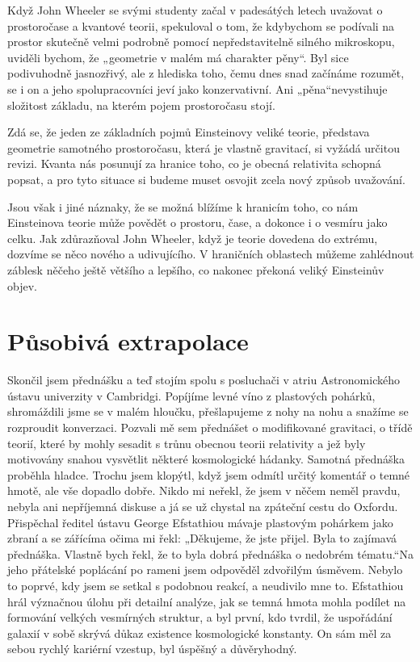   Když John Wheeler se svými studenty začal v padesátých letech uvažovat o prostoročase a kvantové
  teorii, spekuloval o tom, že kdybychom se podívali na prostor skutečně velmi podrobně pomocí
  nepředstavitelně silného mikroskopu, uviděli bychom, že „geometrie v malém má charakter pěny“. Byl
  sice podivuhodně jasnozřivý, ale z hlediska toho, čemu dnes snad začínáme rozumět, se i on a jeho
  spolupracovníci jeví jako konzervativní. Ani „pěna“nevystihuje složitost základu, na kterém pojem
  prostoročasu stojí. 
  
  Zdá se, že jeden ze základních pojmů Einsteinovy veliké teorie, představa geometrie samotného
  prostoročasu, která je vlastně gravitací, si vyžádá určitou revizi. Kvanta nás posunují za hranice
  toho, co je obecná relativita schopná popsat, a pro tyto situace si budeme muset osvojit zcela
  nový způsob uvažování. 
  
  Jsou však i jiné náznaky, že se možná blížíme k hranicím toho, co nám Einsteinova teorie může
  povědět o prostoru, čase, a dokonce i o vesmíru jako celku. Jak zdůrazňoval John Wheeler, když je
  teorie dovedena do extrému, dozvíme se něco nového a udivujícího. V hraničních oblastech můžeme
  zahlédnout záblesk něčeho ještě většího a lepšího, co nakonec překoná veliký Einsteinův objev.

\section{Působivá extrapolace}\label{kulIchIIIsecXIV}
  Skončil jsem přednášku a teď stojím spolu s posluchači v atriu Astronomického ústavu univerzity v
  Cambridgi. Popíjíme levné víno z plastových pohárků, shromáždili jsme se v malém hloučku,
  přešlapujeme z nohy na nohu a snažíme se rozproudit konverzaci. Pozvali mě sem přednášet o
  modifikované gravitaci, o třídě teorií, které by mohly sesadit s trůnu obecnou teorii relativity a
  jež byly motivovány snahou vysvětlit některé kosmologické hádanky. Samotná přednáška proběhla
  hladce. Trochu jsem klopýtl, když jsem odmítl určitý komentář o temné hmotě, ale vše dopadlo
  dobře. Nikdo mi neřekl, že jsem v něčem neměl pravdu, nebyla ani nepříjemná diskuse a já se už
  chystal na zpáteční cestu do Oxfordu. Přispěchal ředitel ústavu George Efstathiou mávaje plastovým
  pohárkem jako zbraní a se zářícíma očima mi řekl: „Děkujeme, že jste přijel. Byla to zajímavá
  přednáška. Vlastně bych řekl, že to byla dobrá přednáška o nedobrém tématu.“Na jeho přátelské
  poplácání po rameni jsem odpověděl zdvořilým úsměvem. Nebylo to poprvé, kdy jsem se setkal s
  podobnou reakcí, a neudivilo mne to. Efstathiou hrál význačnou úlohu při detailní analýze, jak se
  temná hmota mohla podílet na formování velkých vesmírných struktur, a byl první, kdo tvrdil, že
  uspořádání galaxií v sobě skrývá důkaz existence kosmologické konstanty. On sám měl za sebou
  rychlý kariérní vzestup, byl úspěšný a důvěryhodný. 
  

